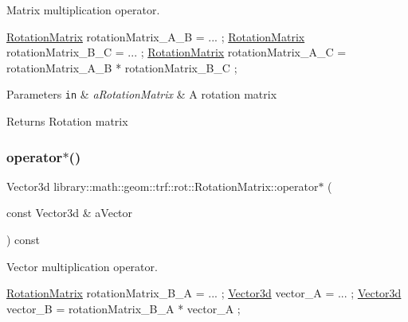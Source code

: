 Matrix multiplication operator. 


\begin{DoxyCode}
\hyperlink{classlibrary_1_1math_1_1geom_1_1trf_1_1rot_1_1_rotation_matrix_a667d2c05aa5b0cc88775938d11164cdc}{RotationMatrix} rotationMatrix\_A\_B = ... ;
\hyperlink{classlibrary_1_1math_1_1geom_1_1trf_1_1rot_1_1_rotation_matrix_a667d2c05aa5b0cc88775938d11164cdc}{RotationMatrix} rotationMatrix\_B\_C = ... ;
\hyperlink{classlibrary_1_1math_1_1geom_1_1trf_1_1rot_1_1_rotation_matrix_a667d2c05aa5b0cc88775938d11164cdc}{RotationMatrix} rotationMatrix\_A\_C = rotationMatrix\_A\_B * rotationMatrix\_B\_C ;
\end{DoxyCode}



\begin{DoxyParams}[1]{Parameters}
\mbox{\tt in}  & {\em a\+Rotation\+Matrix} & A rotation matrix \\
\hline
\end{DoxyParams}
\begin{DoxyReturn}{Returns}
Rotation matrix 
\end{DoxyReturn}
\mbox{\label{classlibrary_1_1math_1_1geom_1_1trf_1_1rot_1_1_rotation_matrix_af4da3ca7389c4126aaf984b6f4340972}} 
\subsubsection{\texorpdfstring{operator$\ast$()}{operator*()}\hspace{0.1cm}{\footnotesize\ttfamily [2/2]}}
{\footnotesize\ttfamily Vector3d library\+::math\+::geom\+::trf\+::rot\+::\+Rotation\+Matrix\+::operator$\ast$ (\begin{DoxyParamCaption}\item[{const Vector3d \&}]{a\+Vector }\end{DoxyParamCaption}) const}



Vector multiplication operator. 


\begin{DoxyCode}
\hyperlink{classlibrary_1_1math_1_1geom_1_1trf_1_1rot_1_1_rotation_matrix_a667d2c05aa5b0cc88775938d11164cdc}{RotationMatrix} rotationMatrix\_B\_A = ... ;
\hyperlink{namespacelibrary_1_1math_1_1obj_a977e84e9bf317a4e7dd9d6d671d6da2f}{Vector3d} vector\_A = ... ;
\hyperlink{namespacelibrary_1_1math_1_1obj_a977e84e9bf317a4e7dd9d6d671d6da2f}{Vector3d} vector\_B = rotationMatrix\_B\_A * vector\_A ;
\end{DoxyCode}



